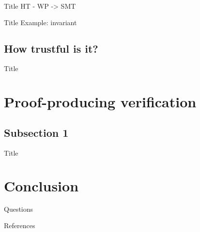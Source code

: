 \documentclass{beamer}
\begin{document}
\begin{frame}{Title}
    HT - WP -> SMT
\end{frame}

\begin{frame}{Title}
    Example: invariant
\end{frame}

\begin{frame}
\end{frame}


\subsection{How trustful is it?}

\begin{frame}{Title}
\end{frame}

\section{Proof-producing verification}

\subsection{Subsection 1}

\begin{frame}{Title}
\end{frame}


\section{Conclusion}

\begin{frame}
    \begin{center}
        \huge
        Questions
    \end{center}
\end{frame}


\appendix

\begin{frame}[allowframebreaks]{References}
    \nocite{*}
    
    
\end{frame}

\end{document}
